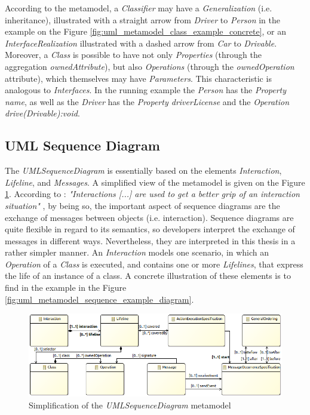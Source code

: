 \documentclass[tuberlin,cic,tc,english,noabntcite]{iiufrgs}
\begin{document}
According to the metamodel, a \emph{Classifier} may have a \emph{Generalization} (i.e. inheritance), illustrated with a straight arrow from \emph{Driver} to \emph{Person} in the example on the Figure \ref{fig:uml_metamodel_class_example_concrete}, or an \emph{InterfaceRealization}  illustrated with a dashed arrow from \emph{Car} to \emph{Drivable}. Moreover, a \emph{Class} is possible to have not only \emph{Properties} (through the aggregation \emph{ownedAttribute}), but also \emph{Operations} (through the \emph{ownedOperation} attribute), which themselves may have \emph{Parameters}. This characteristic is analogous to \emph{Interfaces}. In the running example the \emph{Person} has the \emph{Property name}, as well as the \emph{Driver} has the \emph{Property driverLicense} and the \emph{Operation drive(Drivable):void}. 

\subsection{UML Sequence Diagram}
The \emph{UMLSequenceDiagram} is essentially based on the elements \emph{Interaction}, \emph{Lifeline}, and \emph{Messages}. A simplified view of the metamodel is given on the Figure \ref{fig:uml_metamodel_sequence}. According to \citet[p. 563]{omg2007unified}: \emph{"Interactions [...] are used to get a better grip of an interaction situation"} \citep[p. 563]{omg2007unified}, by being so, the important aspect of sequence diagrams are the exchange of messages between objects (i.e. interaction). Sequence diagrams are quite flexible in regard to its semantics, so developers interpret the exchange of messages in different ways. Nevertheless, they are interpreted in this thesis in a rather simpler manner. An \emph{Interaction} models one scenario, in which an \emph{Operation} of a \emph{Class} is executed, and contains one or more \emph{Lifelines}, that express the life of an instance of a class. A concrete illustration of these elements is to find in the example in the Figure \ref{fig:uml_metamodel_sequence_example_diagram}.

\begin{figure}[H]
    \caption{Simplification of the \emph{UMLSequenceDiagram} metamodel}
    \begin{center}
        \includegraphics[width=\textwidth]{umlSequenceDiagramSimple01}
    \end{center}
    \label{fig:uml_metamodel_sequence}
\end{figure}
\end{document}
